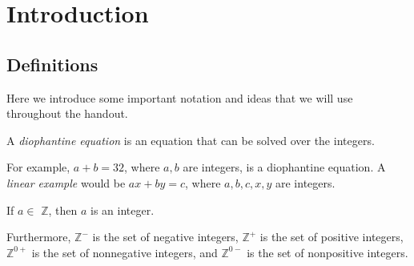\documentclass[mast]{lucky}
\begin{document}
\section{Introduction}
\subsection{Definitions}
Here we introduce some important notation and ideas that we will use throughout the handout.
\begin{defi}
A \emph{diophantine equation} is an equation that can be solved over the integers. 
\end{defi}
For example, $a+b=32$, where $a,b$ are integers, is a diophantine equation.  A \textit{linear example} would be $ax+by=c$, where $a,b,c,x,y$ are integers.
\begin{defi}[$\mathbb{Z}$]
If $a\in$ \emph{$\mathbb{Z}$}, then $a$ is an integer.
\end{defi}
Furthermore, \emph{$\mathbb{Z}^-$} is the set of negative integers, \emph{$\mathbb{Z}^+$} is the set of positive integers, \emph{$\mathbb{Z}^{0+}$} is the set of nonnegative integers, and \emph{$\mathbb{Z}^{0-}$} is the set of nonpositive integers.
\end{document}
